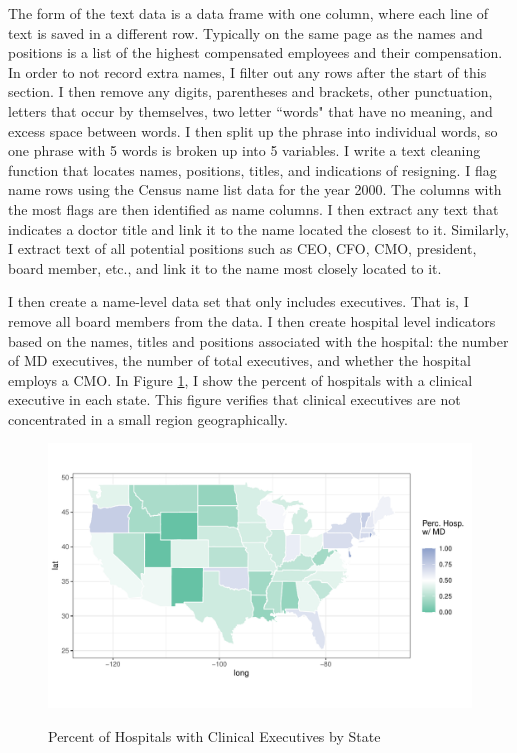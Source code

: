 \documentclass[12pt]{article}
\begin{document}
The form of the text data is a data frame with one column, where each line of text is saved in a different row. Typically on the same page as the names and positions is a list of the highest compensated employees and their compensation. In order to not record extra names, I filter out any rows after the start of this section. I then remove any digits, parentheses and brackets, other punctuation, letters that occur by themselves, two letter ``words" that have no meaning, and excess space between words. I then split up the phrase into individual words, so one phrase with 5 words is broken up into 5 variables. I write a text cleaning function that locates names, positions, titles, and indications of resigning. I flag name rows using the Census name list data for the year 2000. The columns with the most flags are then identified as name columns. I then extract any text that indicates a doctor title and link it to the name located the closest to it. Similarly, I extract text of all potential positions such as CEO, CFO, CMO, president, board member, etc., and link it to the name most closely located to it. 

I then create a name-level data set that only includes executives. That is, I remove all board members from the data. I then create hospital level indicators based on the names, titles and positions associated with the hospital: the number of MD executives, the number of total executives, and whether the hospital employs a CMO. In Figure \ref{fig:state_doc}, I show the percent of hospitals with a clinical executive in each state. This figure verifies that clinical executives are not concentrated in a small region geographically. 

\begin{figure}[ht!]
    \centering
    \caption{Percent of Hospitals with Clinical Executives by State}
    \includegraphics[width=\textwidth]{Objects/has_doc_avg_map.pdf}
    \label{fig:state_doc}
\end{figure}
\end{document}
